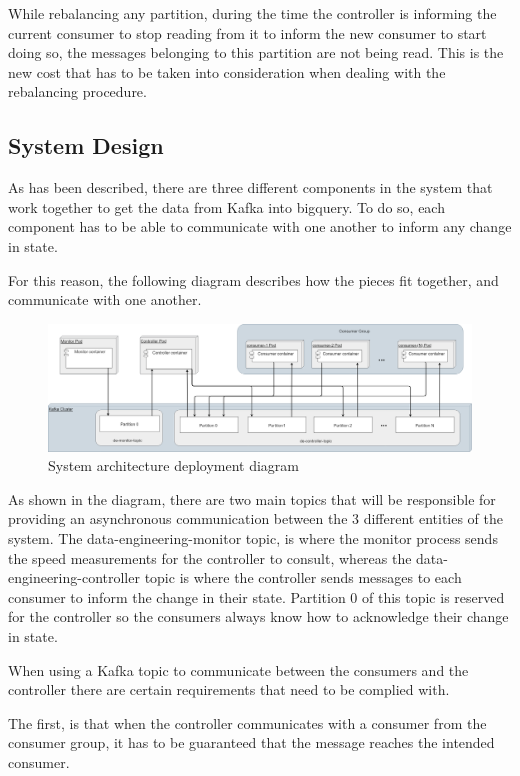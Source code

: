 While rebalancing any partition, during the time the controller is informing the
current consumer to stop reading from it to inform the new consumer to start
doing so, the messages belonging to this partition are not being read. This is
the new cost that has to be taken into consideration when dealing with the
rebalancing procedure.

\subsection{System Design}

As has been described, there are three different components in the system that
work together to get the data from Kafka into bigquery. To do so, each component
has to be able to communicate with one another to inform any change in state. 

For this reason, the following diagram describes how the pieces fit together,
and communicate with one another.

\begin{figure}[H] \centering
\includegraphics[width=\textwidth]{images/controller/System Design.png}
\caption{System architecture deployment diagram} \label{fig:system_architecture}
\end{figure}

As shown in the diagram, there are two main topics that will be responsible for
providing an asynchronous communication between the 3 different entities of the
system. The data-engineering-monitor topic, is where the monitor process sends
the speed measurements for the controller to consult, whereas the
data-engineering-controller topic is where the controller sends messages to each
consumer to inform the change in their state. Partition 0 of this topic is
reserved for the controller so the consumers always know how to acknowledge
their change in state.

When using a Kafka topic to communicate between the consumers and the controller
there are certain requirements that need to be complied with. 

The first, is that when the controller communicates with a consumer from the
consumer group, it has to be guaranteed that the message reaches the intended
consumer. 

